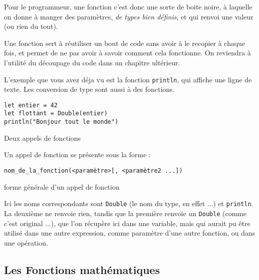 Pour le programmeur, une fonction c'est donc une sorte de boite noire, à laquelle on donne à manger des paramètres, \emph{de types bien définis}, et qui renvoi une valeur (ou rien du tout).

Une fonction sert à réutiliser un bout de code sans avoir à le recopier à chaque fois, et permet de ne pas avoir à savoir comment cela fonctionne.
On reviendra à l'utilité du découpage du code dans un chapitre ultérieur.

L'exemple que vous avez déja vu est la fonction \texttt{println}, qui affiche une ligne de texte. Les conversion de type sont aussi à des fonctions.

\begin{listing}[h]
\begin{verbatim}
let entier = 42
let flottant = Double(entier)
println("Bonjour tout le monde")
\end{verbatim}
\caption{Deux appels de fonctions}
\end{listing}

Un appel de fonction se présente sous la forme :
\begin{listing}[h]
\begin{verbatim}
nom_de_la_fonction(<paramètre>[, <paramètre2 ...]) 
\end{verbatim}
\caption{forme générale d'un appel de fonction}
\end{listing}

Ici les noms correspondants sont \texttt{Double} (le nom du type, en effet ...) et \texttt{println}. La deuxième ne renvoie rien, tandis que la première renvoie un \texttt{Double} (comme c'est original ...), que l'on récupère ici dans une variable, mais qui aurait pu être utilisé dans une autre expression, comme paramètre d'une autre fonction, ou dans une opération.

\subsection{Les Fonctions mathématiques}

